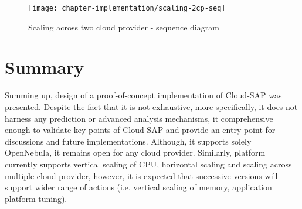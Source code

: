 \begin{figure}[!ht]
  \begin{center}
    \texttt{[image: chapter-implementation/scaling-2cp-seq]}
  \end{center}
  \caption{Scaling across two cloud provider - sequence diagram}
  \label{fig:scaling-2cp-seq}
\end{figure}

\newpage
\section{Summary}
Summing up, design of a proof-of-concept implementation of Cloud-SAP was presented. Despite the fact that it is not exhaustive, more specifically, it does not harness any prediction or advanced analysis mechanisms, it comprehensive enough to validate key points of Cloud-SAP and provide an entry point for discussions and future implementations. Although, it supports solely OpenNebula, it remains open for any cloud provider. Similarly, platform currently supports vertical scaling of CPU, horizontal scaling and scaling across multiple cloud provider, however, it is expected that successive versions will support wider range of actions (i.e. vertical scaling of memory, application platform tuning).



